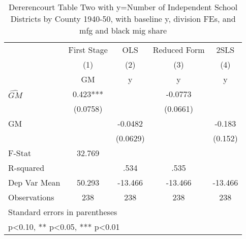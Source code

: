 \begin{table}[htbp]\centering
\def\sym#1{\ifmmode^{#1}\else\(^{#1}\)\fi}
\caption{Dererencourt Table Two with y=Number of Independent School Districts by County 1940-50, with baseline y, division FEs, and mfg and black mig share}
\begin{tabular}{l*{4}{c}}
\toprule
                    & First Stage   &         OLS   &Reduced Form   &        2SLS   \\
                    &\multicolumn{1}{c}{(1)}&\multicolumn{1}{c}{(2)}&\multicolumn{1}{c}{(3)}&\multicolumn{1}{c}{(4)}\\
                    &\multicolumn{1}{c}{GM}&\multicolumn{1}{c}{y}&\multicolumn{1}{c}{y}&\multicolumn{1}{c}{y}\\
\midrule
$\hat{GM}$          &       0.423***&               &     -0.0773   &               \\
                    &    (0.0758)   &               &    (0.0661)   &               \\
\addlinespace
GM                  &               &     -0.0482   &               &      -0.183   \\
                    &               &    (0.0629)   &               &     (0.152)   \\
\midrule
F-Stat              &      32.769   &               &               &               \\
R-squared           &               &        .534   &        .535   &               \\
Dep Var Mean        &      50.293   &     -13.466   &     -13.466   &     -13.466   \\
Observations        &         238   &         238   &         238   &         238   \\
\bottomrule
\multicolumn{5}{l}{\footnotesize Standard errors in parentheses}\\
\multicolumn{5}{l}{\footnotesize * p<0.10, ** p<0.05, *** p<0.01}\\
\end{tabular}
\end{table}

